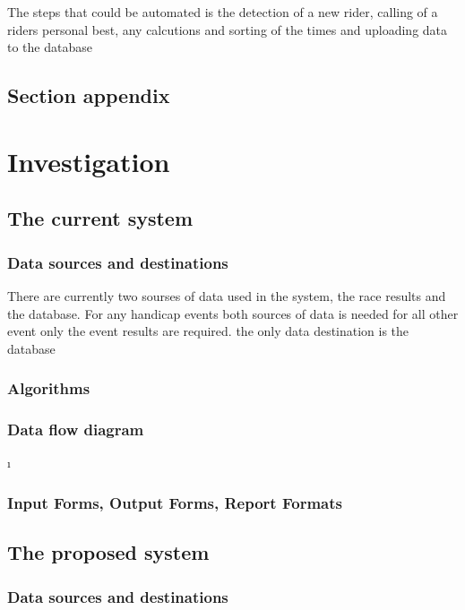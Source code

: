 The steps that could be automated is the detection of a new rider, calling of a riders personal best, any calcutions and sorting of the times and uploading data to the database
\subsection{Section appendix}



\section{Investigation}

\subsection{The current system}

\subsubsection{Data sources and destinations}
There are currently two sourses of data used in the system, the race results and the database. For any handicap events both sources of data is needed for all other event only the event results are required. the only data destination is the database
\subsubsection{Algorithms}

\subsubsection{Data flow diagram}\i

\subsubsection{Input Forms, Output Forms, Report Formats}

\subsection{The proposed system}

\subsubsection{Data sources and destinations}

